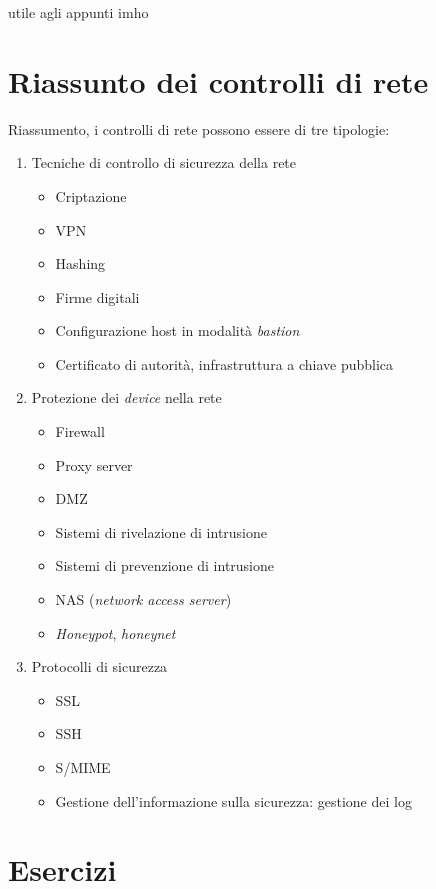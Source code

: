 utile agli appunti imho

\section{Riassunto dei controlli di rete}

Riassumento, i controlli di rete possono essere di tre tipologie:

\begin{enumerate}
 \item Tecniche di controllo di sicurezza della rete
 \begin{itemize}
  \item Criptazione
  \item VPN
  \item Hashing
  \item Firme digitali
  \item Configurazione host in modalità \textit{bastion}
  \item Certificato di autorit\`a, infrastruttura a chiave pubblica
 \end{itemize}

 \item Protezione dei \textit{device} nella rete
 \begin{itemize}
  \item Firewall
  \item Proxy server
  \item DMZ
  \item Sistemi di rivelazione di intrusione
  \item Sistemi di prevenzione di intrusione
  \item NAS (\textit{network access server})
  \item \textit{Honeypot}, \textit{honeynet}
 \end{itemize}

 \item Protocolli di sicurezza
 \begin{itemize}
  \item SSL
  \item SSH
  \item S/MIME
  \item Gestione dell'informazione sulla sicurezza: gestione dei log
 \end{itemize}
\end{enumerate}



\section{Esercizi}

